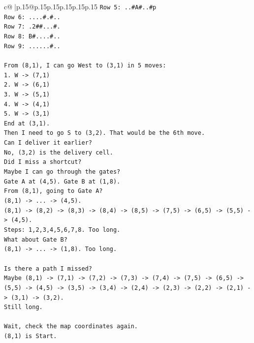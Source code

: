 \documentclass{article}
\begin{document}
{\begin{supertabular}{c@{$\;$}|p{.15\linewidth}@{}p{.15\linewidth}p{.15\linewidth}p{.15\linewidth}p{.15\linewidth}p{.15\linewidth}}
{{{\texttt{Row 5: ..\#A\#..\#p} \\
\texttt{Row 6: ....\#.\#..} \\
\texttt{Row 7: .2\#\#...\#.} \\
\texttt{Row 8: B\#....\#..} \\
\texttt{Row 9: ......\#..} \\
\\ 
\texttt{From (8,1), I can go West to (3,1) in 5 moves:} \\
\texttt{1. W {-}> (7,1)} \\
\texttt{2. W {-}> (6,1)} \\
\texttt{3. W {-}> (5,1)} \\
\texttt{4. W {-}> (4,1)} \\
\texttt{5. W {-}> (3,1)} \\
\texttt{End at (3,1).} \\
\texttt{Then I need to go S to (3,2). That would be the 6th move.} \\
\texttt{Can I deliver it earlier?} \\
\texttt{No, (3,2) is the delivery cell.} \\
\texttt{Did I miss a shortcut?} \\
\texttt{Maybe I can go through the gates?} \\
\texttt{Gate A at (4,5). Gate B at (1,8).} \\
\texttt{From (8,1), going to Gate A?} \\
\texttt{(8,1) {-}> ... {-}> (4,5).} \\
\texttt{(8,1) {-}> (8,2) {-}> (8,3) {-}> (8,4) {-}> (8,5) {-}> (7,5) {-}> (6,5) {-}> (5,5) {-}> (4,5).} \\
\texttt{Steps: 1,2,3,4,5,6,7,8. Too long.} \\
\texttt{What about Gate B?} \\
\texttt{(8,1) {-}> ... {-}> (1,8). Too long.} \\
\\ 
\texttt{Is there a path I missed?} \\
\texttt{Maybe (8,1) {-}> (7,1) {-}> (7,2) {-}> (7,3) {-}> (7,4) {-}> (7,5) {-}> (6,5) {-}> (5,5) {-}> (4,5) {-}> (3,5) {-}> (3,4) {-}> (2,4) {-}> (2,3) {-}> (2,2) {-}> (2,1) {-}> (3,1) {-}> (3,2).} \\
\texttt{Still long.} \\
\\ 
\texttt{Wait, check the map coordinates again.} \\
\texttt{(8,1) is Start.} \\
}}}
\end{supertabular}}
\end{document}
